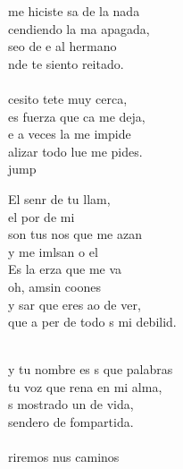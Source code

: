 \begin{cancion}%
	 me hiciste sa de la nada \\
	cendiendo la ma apagada,\\
	seo de e al hermano\\
	nde te siento reitado.\\
	\jump\\
	cesito tete muy cerca,\\
	es fuerza que ca me deja,\\
	e a veces la  me impide\\
	alizar todo lue me pides.\\jump\\
	\begin{chorus}%
	El senr de tu llam,\\
	el por de mi\\
	son tus nos que me azan\\
	y me imlsan o el \\
	Es la erza que me va\\
	oh,  amsin coones\\
	y sar que eres ao de ver,\\
	que a per de todo s mi debilid.\\
	\end{chorus}%
	\jump\\
	y tu nombre es s que palabras\\
	 tu voz que rena en mi alma,\\
	s mostrado un  de vida,\\
	 sendero de fompartida.\\
	\jump\\
	riremos nus caminos \\

\end{cancion}
